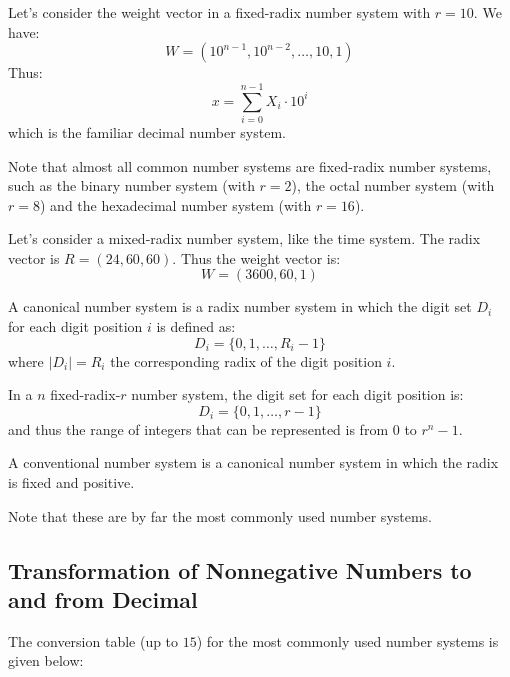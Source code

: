 \begin{eg}
    Let's consider the weight vector in a fixed-radix number system with $r = 10$. We have:
    \[
        W = (10^{n-1}, 10^{n-2}, \ldots, 10, 1)
    \]
    Thus:
    \[
        x = \sum_{i = 0}^{n - 1} X_i \cdot 10^i
    \]
    which is the familiar decimal number system.
\end{eg}
Note that almost all common number systems are fixed-radix number systems, such as the binary number system (with $r = 2$), the octal number system (with $r = 8$) and the hexadecimal number system (with $r = 16$).

\begin{eg}
    Let's consider a mixed-radix number system, like the time system. The radix vector is $R = (24, 60, 60)$. Thus the weight vector is:
    \[
        W = (3600, 60, 1)
    \]
\end{eg}

\begin{definition}
    A canonical number system is a radix number system in which the digit set $D_i$ for each digit position $i$ is defined as:
    \[
        D_i = \{0, 1, \ldots, R_i - 1\}
    \]
    where $|D_i| = R_i$ the corresponding radix of the digit position $i$.
\end{definition}

\begin{eg}
    In a $n$ fixed-radix-$r$ number system, the digit set for each digit position is:
    \[
        D_i = \{0, 1, \ldots, r - 1\}
    \]
    and thus the range of integers that can be represented is from $0$ to $r^n - 1$.
\end{eg}

\begin{definition}
    A conventional number system is a canonical number system in which the radix is fixed and positive.
\end{definition}
Note that these are by far the most commonly used number systems.

\subsection{Transformation of Nonnegative Numbers to and from Decimal}
The conversion table (up to $15$) for the most commonly used number systems is given below:
\vskip0.3cm

